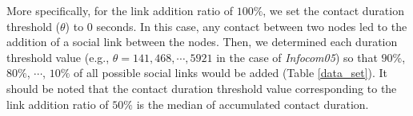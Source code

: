 More specifically, for the link addition ratio of $100\%$, we set the contact duration threshold ($\theta$) to 0 seconds.
In this case, any contact between two nodes led to the addition of a social link between the nodes.
Then, we determined each duration threshold value (e.g., $\theta=141, 468, \cdots, 5921$ in the case of {\em Infocom05}) so that $90\%$, $80\%$, $\cdots$, $10\%$ of all possible social links would be added (Table \ref{data_set}). 
It should be noted that the contact duration threshold value corresponding to the link addition ratio of $50\%$ is the median of accumulated contact duration.


% 

